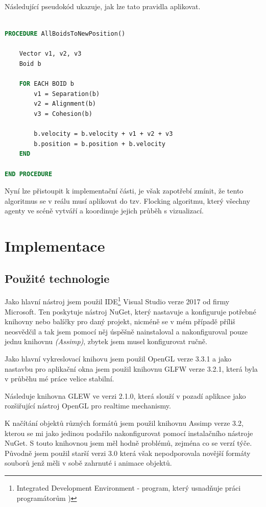 \documentclass[czech,public,dept460,male,cpdeclaration]{diploma}
\begin{document}
Následující pseudokód ukazuje, jak lze tato pravidla aplikovat.

\begin{lstlisting}[language=pascal,label=src:Flocking pseudocode,caption=Pseudokód pro aplikování třech pravidel]

PROCEDURE AllBoidsToNewPosition()

	Vector v1, v2, v3
	Boid b
	
	FOR EACH BOID b
		v1 = Separation(b)
		v2 = Alignment(b)
		v3 = Cohesion(b)
		
		b.velocity = b.velocity + v1 + v2 + v3
		b.position = b.position + b.velocity
	END

END PROCEDURE

\end{lstlisting}

Nyní lze přistoupit k implementační části, je však zapotřebí zmínit, že tento algoritmus se v reálu musí aplikovat do tzv. Flocking algoritmu, který všechny agenty ve scéně vytváří a koordinuje jejich průběh s vizualizací.

\newpage
\section{Implementace}

\subsection{Použité technologie}
Jako hlavní nástroj jsem použil IDE\footnote{Integrated Development Environment - program, který usnadňuje práci programátorům \cite{linkToIDE})} Visual Studio verze 2017 od firmy Microsoft. Ten poskytuje nástroj NuGet, který nastavuje a konfiguruje potřebné knihovny nebo balíčky pro daný projekt, nicméně se v mém případě příliš neosvědčil a tak jsem pomocí něj úspěšně nainstaloval a nakonfiguroval pouze jednu knihovnu \textit{(Assimp)}, zbytek jsem musel konfigurovat ručně.

Jako hlavní vykreslovací knihovu jsem použil OpenGL \cite{linkToOpenGL} verze 3.3.1 a jako nastavbu pro aplikační okna jsem použil knihovnu GLFW \cite{linkToGLFW} verze 3.2.1, která byla v průběhu mé práce velice stabilní. 

Následuje knihovna GLEW \cite{linkToGLew} ve verzi 2.1.0, která slouží v pozadí aplikace jako rozšiřující nástroj OpenGL pro realtime mechanismy. 

K načítání objektů různých formátů jsem použil knihovnu Assimp \cite{linkToAssimp} verze 3.2, kterou se mi jako jedinou podařilo nakonfigurovat pomocí instalačního nástroje NuGet. S touto knihovnou jsem měl hodně problémů, zejména co se verzí týče. Původně jsem použil starší verzi 3.0 která však nepodporovala novější formáty souborů jenž měli v sobě zahrnuté i animace objektů.
\end{document}
